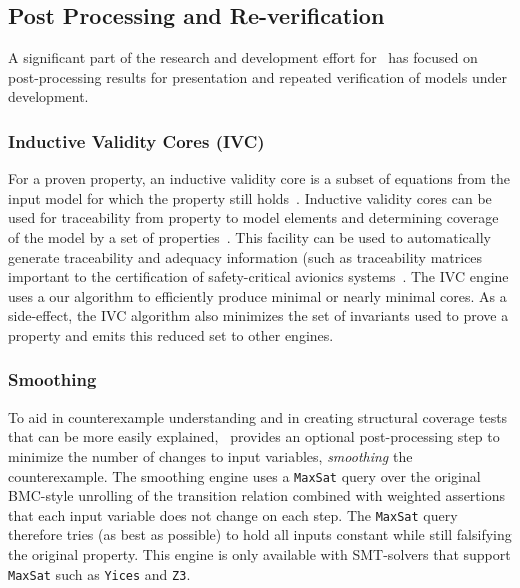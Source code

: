 \subsection{Post Processing and Re-verification}

A significant part of the research and development effort for \jkind\ has focused on
post-processing results for presentation and repeated verification of models under development.


\subsubsection{Inductive Validity Cores (IVC)}

For a proven property, an inductive validity core is a subset of \lustre equations from the input model for which the property still
holds~\cite{ghassabani2016fse}.  Inductive validity cores can be used for traceability from property to model elements and determining coverage of the model by a set of properties~\cite{Ghass17Cov}.  This facility can be used to automatically generate traceability and adequacy information (such as traceability matrices~\cite{fifarek2017nfm} important to the certification of safety-critical avionics systems~\cite{DO178C}.
The IVC engine uses a our \ucalg algorithm to efficiently produce minimal or nearly minimal cores. As a side-effect, the IVC algorithm also minimizes the set of invariants used to prove a property and emits this reduced set to other engines.

\subsubsection{Smoothing}

To aid in counterexample understanding and in creating structural coverage tests that can be more easily explained, \jkind\ provides an optional post-processing step to minimize the number of changes to input variables, {\em smoothing} the counterexample.
The smoothing engine uses a \texttt{MaxSat} query over
the original BMC-style unrolling of the transition relation combined
with weighted assertions that each input variable does not change on
each step. The \texttt{MaxSat} query therefore tries (as best as
possible) to hold all inputs constant while still falsifying the
original property. This engine is only available with SMT-solvers that
support \texttt{MaxSat} such as \texttt{Yices} and \texttt{Z3}.

